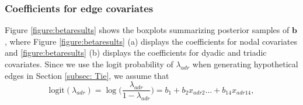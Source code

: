 \documentclass[ba]{imsart}
\numberwithin{equation}{section}
\theoremstyle{plain}
\begin{document}
	\subsubsection{Coefficients for edge covariates}
	Figure \ref{figure:betaresults} shows the boxplots summarizing posterior samples of $\boldsymbol{b}$, where Figure \ref{figure:betaresults} (a) displays the coefficients for nodal covariates and \ref{figure:betaresults} (b) displays the coefficients for dyadic and triadic covariates. Since we use the logit probability of $\lambda_{adr}$ when generating hypothetical edges in Section \ref{subsec: Tie}, we assume that 
	\begin{equation*}
	\mbox{logit}(\lambda_{adr})=\log\Big(\frac{\lambda_{adr}}{1-\lambda_{adr}}\Big) =b_{1}+b_{2} x_{adr2}\ldots+b_{14}x_{adr14},
	\end{equation*}
\end{document}
